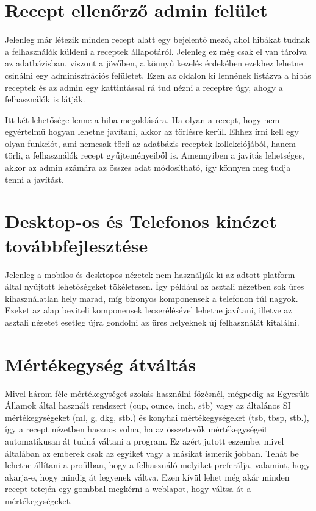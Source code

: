 \documentclass[12pt]{report}
\theoremstyle{definition}
\begin{document}
\section{Recept ellenőrző admin felület}
Jelenleg már létezik minden recept alatt egy bejelentő mező, ahol hibákat tudnak a felhasználók küldeni a receptek állapotáról. Jelenleg ez még csak el van tárolva az adatbázisban, viszont a jövőben, a könnyű kezelés érdekében ezekhez lehetne csinálni egy adminisztrációs felületet. Ezen az oldalon ki lennének listázva a hibás receptek és az admin egy kattintással rá tud nézni a receptre úgy, ahogy a felhasználók is látják.

Itt két lehetősége lenne a hiba megoldására. Ha olyan a recept, hogy nem egyértelmű hogyan lehetne javítani, akkor az törlésre kerül. Ehhez írni kell egy olyan funkciót, ami nemcsak törli az adatbázis receptek kollekciójából, hanem törli,  a felhasználók  recept gyűjteményeiből is. Amennyiben a javítás lehetséges, akkor az admin számára az összes adat módosítható, így könnyen meg tudja tenni a javítást.


\section{Desktop-os és Telefonos kinézet továbbfejlesztése}
Jelenleg a mobilos és desktopos nézetek nem használják ki az adtott platform által nyújtott lehetőségeket tökéletesen. Így például az asztali nézetben sok üres kihasználatlan hely marad, míg bizonyos komponensek a telefonon túl nagyok. Ezeket az alap beviteli komponensek lecserélésével lehetne javítani, illetve az asztali nézetet esetleg újra gondolni az üres helyeknek új felhasználát kitalálni.  

\section{Mértékegység átváltás}
Mivel három féle mértékegységet szokás használni főzésnél, mégpedig az Egyesült Államok által használt rendszert (cup, ounce, inch, stb) vagy az általános SI mértékegységeket (ml, g, dkg, stb.) és konyhai mértékegységeket (tsb, tbsp, stb.), így a recept nézetben hasznos volna, ha az összetevők mértékegységeit automatikusan át tudná váltani a program. Ez azért jutott eszembe, mivel általában az emberek csak az egyiket vagy a másikat ismerik jobban. Tehát be lehetne állítani a profilban, hogy a felhasználó melyiket preferálja, valamint, hogy akarja-e, hogy mindig át legyenek váltva. Ezen kívül lehet még akár minden recept tetején egy gombbal megkérni a weblapot, hogy váltsa át a mértékegységeket.
\end{document}
